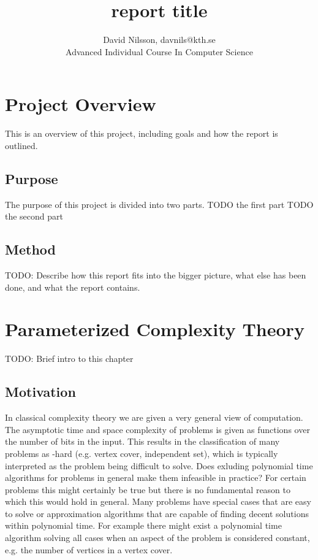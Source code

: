 \documentclass[a4paper,11pt,notitlepage]{report}
\title{report title}
\author{David Nilsson, davnils@kth.se \\ Advanced Individual Course In Computer Science}
\theoremstyle{plain}
\theoremstyle{definition}
\begin{document}
\maketitle
\clearpage


\tableofcontents

\chapter{Project Overview}
This is an overview of this project, including goals and how the report is outlined.

\section{Purpose}
The purpose of this project is divided into two parts.
TODO the first part
TODO the second part

\section{Method}
TODO: Describe how this report fits into the bigger picture, what else has been
done, and what the report contains.

\chapter{Parameterized Complexity Theory}
TODO: Brief intro to this chapter

\section{Motivation}
In classical complexity theory we are given a very general view of computation.
The asymptotic time and space complexity of problems is given as functions over the number of bits in the input.
This results in the classification of many problems as \NP-hard (e.g. vertex cover, independent set), which is typically interpreted as the problem being difficult to solve.
Does exluding polynomial time algorithms for problems in general make them infeasible in practice?
For certain problems this might certainly be true but there is no fundamental reason to which this would hold in general.
Many problems have special cases that are easy to solve or approximation algorithms that are capable of finding decent solutions within polynomial time.
For example there might exist a polynomial time algorithm solving all cases when an aspect of the problem is considered constant, e.g. the number of vertices in a vertex cover.
\end{document}

